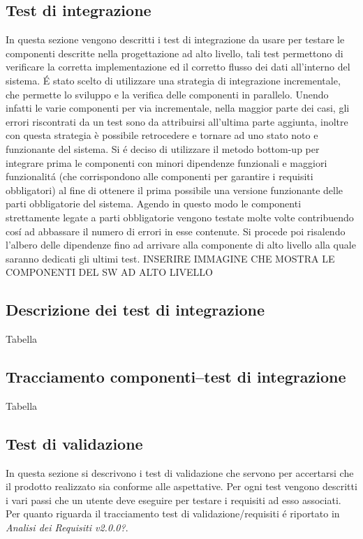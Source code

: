 \newpage

\subsection{Test di integrazione}
In questa sezione vengono descritti i test di integrazione da usare per testare le componenti descritte nella progettazione ad alto livello, tali test permettono di verificare la corretta implementazione ed il corretto flusso dei dati all'interno del sistema. \'E stato scelto di utilizzare una strategia di integrazione incrementale, che permette lo sviluppo e la verifica delle componenti in parallelo. Unendo infatti le varie componenti per via incrementale, nella maggior parte dei casi, gli errori riscontrati da un test sono da attribuirsi all'ultima parte aggiunta, inoltre con questa strategia è possibile retrocedere e tornare ad uno stato noto e funzionante del sistema. Si \'e deciso di utilizzare il metodo \gls{bottom-up} per integrare prima le componenti con minori dipendenze funzionali e maggiori funzionalit\'a (che corrispondono alle componenti per garantire i requisiti obbligatori) al fine di ottenere il prima possibile una versione funzionante delle parti obbligatorie del sistema. Agendo in questo modo le componenti strettamente legate a parti obbligatorie vengono testate molte volte contribuendo cos\'i ad abbassare il numero di errori in esse contenute. Si procede poi risalendo l'albero delle dipendenze fino ad arrivare alla componente di alto livello alla quale saranno dedicati gli ultimi test.
\newline
\newline
INSERIRE IMMAGINE CHE MOSTRA LE COMPONENTI DEL SW AD ALTO LIVELLO
\newline
\newline
\subsection{Descrizione dei test di integrazione}
Tabella
\subsection{Tracciamento componenti–test di integrazione}
Tabella
\subsection{Test di validazione}
In questa sezione si descrivono i test di validazione che servono per accertarsi che il prodotto realizzato sia conforme alle aspettative.
Per ogni test vengono descritti i vari passi che un utente deve eseguire per testare i requisiti ad esso associati. Per quanto riguarda il tracciamento test di validazione/requisiti \'e riportato in \textit{Analisi dei Requisiti v2.0.0?}.

